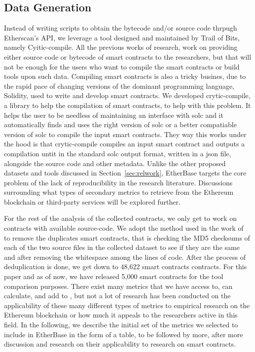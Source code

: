 	\subsection{Data Generation}
		Instead of writing scripts to obtain the bytecode and/or source code thrpugh Etherscan's API, we leverage a tool designed and maintained by Trail of Bits, namely Cyitic-compile.
		All the previous works of research, work on providing either source code or bytecode of smart contracts to the researchers, but that will not be enough for the users who want to compile the smart contracts or build tools upon such data.
		Compiling smart contracts is also a tricky busines, due to the rapid pace of changing versions of the dominant programming language, Solidity, used to write and develop smart contracts.
		We developed crytic-compile, a library to help the compilation of smart contracts, to help with this problem.
		It helps the user to be needless of maintaining an interface with solc and it automatically finds and uses the right version of solc or a better compatiable version of solc to compile the input smart contracts.
		They way this works under the hood is that crytic-compile compiles an input smart contract and outputs a compilation untit in the standard solc output format, written in a json file, alongside the source code and other metadata.
		Unlike the other proposed datasets and tools discussed in Section~\ref{sec:relwork}, EtherBase targets the core problem of the lack of reproducibility in the research literature.
		Discussions surrounding what types of secondary metrics to retrieve from the Ethereum blockchain or third-party services will be explored further.
		
		For the rest of the analysis of the collected contracts, we only get to work on contracts with available source-code.
		We adopt the method used in the work of ~\cite{deduplicate} to remove the duplicates smart contracts,
		that is checking the MD5 checksums of each of the two source files in the collected dataset to see if they are the same and after removing the whitespace among the lines of code.
		After the process of deduplication is done, we get down to 48,622 smart contracts contracts.
		For this paper and as of now, we have released 5,000 smart contracts for the tool comparison purposes.
		There exist many metrics that we have access to, can calculate, and add to \etherbase, but not a lot of research has been conducted on the applicability
		of these many different types of metrics to empirical research on the Ethereum blockchain or how much it appeals to the researchers active in this field.
		In the following, we describe the initial set of the metrics we selected to include in EtherBase in the form of a table, to be followed by more,
		after more discussion and research on their applicability to research on smart contracts.

